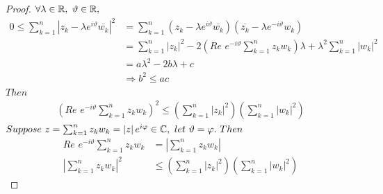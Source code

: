 \begin{enumerate}
\begin{proposition}
			\begin{proof}
				$\forall \lambda \in \mathbb{R} , \,\, \vartheta \in \mathbb{R} ,$
				\begin{align}
					0 \leq 
					\sum_{k = 1}^{n}{\left| z_k - \lambda e^{i\vartheta} \overline{w_k} \right|^2} 
					&= \sum_{k = 1}^{n}
					{(z_k - \lambda e^{i\vartheta} \overline{w_k}) (\overline{z_k} - \lambda e^{-i\vartheta} w_k)}\\
					&= \sum_{k = 1}^{n}{\left| z_k \right|^2} - 2\left( Re \,\, e^{-i\vartheta} 
					\sum_{k = 1}^{n}{z_k w_k} \right) \lambda + \lambda^2 \sum_{k = 1}^{n}{\left| w_k \right|^2}\\
					&= a \lambda^2 - 2b \lambda + c \\
					&\Rightarrow b^2 \leq ac
				\end{align}
				$Then$
				\begin{align}
					\left( Re \,\, e^{-i\vartheta} \sum_{k = 1}^{n}{z_k w_k} \right)^2 \leq 
					\left( \sum_{k = 1}^{n}{\left| z_k \right|^2} \right)
					\left( \sum_{k = 1}^{n}{\left| w_k \right|^2} \right) 
				\end{align}
				$Suppose \,\, z = \sum_{k = 1}^{n}{z_k w_k} = \left| z \right| e^{i \varphi} \in \mathbb{C} , \,\, let \,\, \vartheta = \varphi . \,\, Then$
				\begin{align}
					Re \,\, e^{-i\vartheta} \sum_{k = 1}^{n}{z_k w_k} &= \left| \sum_{k = 1}^{n}{z_k w_k} \right| \\
					\left| \sum_{k = 1}^{n}{z_k w_k} \right|^2 &\leq 
					\left( \sum_{k = 1}^{n}{\left| z_k \right|^2} \right)
					\left( \sum_{k = 1}^{n}{\left| w_k \right|^2} \right)
				\end{align}
			\end{proof}
		\end{proposition}
	\end{enumerate}

\newpage
